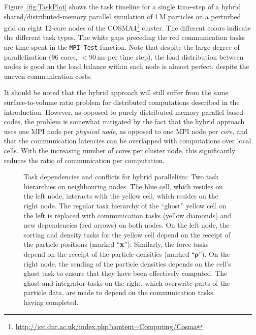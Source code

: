 \documentclass[final]{siamltex}
\newcommand{\fig}[1]
    {Figure~\ref{fig:#1}}
\begin{document}
\fig{TaskPlot} shows the task timeline for a single time-step of a hybrid
shared/distributed-memory parallel simulation of 1\,M particles on a
perturbed grid on eight 12-core nodes of the
COSMA4\footnote{\url{http://icc.dur.ac.uk/index.php?content=Computing/Cosma}} cluster.
The different colors indicate the different task types.
The white gaps preceding the red communication tasks are time spent
in the {\tt MPI\_Test} function.
Note that despite the large degree of parallelization (96 cores, $<90$\,ms
per time step), the load distribution between nodes is good an the
load balance within each node is almost perfect, despite the uneven
communication costs.
        
It should be noted that the hybrid approach will still suffer from the
same surface-to-volume ratio problem for distributed computations
described in the introduction.
However, as opposed to purely distributed-memory parallel based
codes, the problem is somewhat mitigated by the fact that
the hybrid approach uses one MPI node per {\em physical node},
as opposed to one MPI node per {\em core}, and that the communication
latencies can be overlapped with computations over local cells.
With the increasing number of cores per cluster node,
this significantly reduces the ratio of communication per
computation.


\begin{figure}
    \centerline{}
    
    \caption{Task dependencies and conflicts for hybrid parallelism:
        Two task hierarchies on neighbouring nodes.
        The blue cell, which resides on the left node, interacts
        with the yellow cell, which resides on the right node.
        The regular task hierarchy of the ``ghost'' yellow cell on the
        left is replaced with communication tasks (yellow diamonds)
        and new dependencies (red arrows) on both nodes.
        On the left node, the sorting and density tasks for the yellow cell
        depend on the receipt of the particle positions (marked ``{\bf x}'').
        Similarly, the force tasks depend on the receipt of the
        particle densities (marked ``$\boldsymbol\rho$'').
        On the right node, the sending of the particle densities
        depends on the cell's ghost task to ensure that they have
        been effectively computed.
        The ghost and integrator tasks on the right, which overwrite
        parts of the particle data, are made
        to depend on the communication tasks having completed.
        }
    \label{fig:Hierarchy3}
\end{figure}
\end{document}
